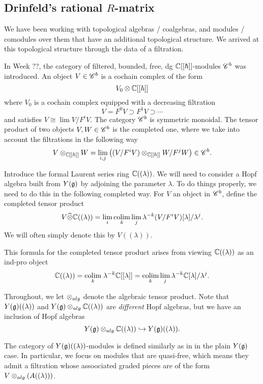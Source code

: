 \documentclass[11pt]{amsart}
\begin{document}
\subsection{Drinfeld's rational $R$-matrix}
We have been working with topological algebras / coalgebras, and modules / comodules over them that have an additional topological structure. 
We arrived at this topological structure through the data of a filtration.

In Week ??, the category of filtered, bounded, free, dg $\mathbb C[[\hbar]]$-modules $\mathscr C^b$ was introduced. 
An object $V \in \mathscr C^b$ is a cochain complex of the form
\[
V_0 \otimes \mathbb C[[\hbar]] 
\]
where $V_0$ is a cochain complex equipped with a decreasing filtration $$V = F^0 V \supset F^1 V \supset \cdots$$ and satisfies $V \cong \lim V / F^i V.$
The category $\mathscr C^b$ is symmetric monoidal.
The tensor product of two objects $V, W \in \mathscr C^b$ is the completed one, where we take into account the filtrations in the following way
\[
V \otimes_{\mathbb C[[\hbar]]} W = \lim_{i,j} \left((V / F^i V) \otimes_{\mathbb C[[\hbar]]} W / F^j W\right)  \in \mathscr C^b .
\]

Introduce the formal Laurent series ring $\mathbb C((\lambda))$. 
We will need to consider a Hopf algebra built from $Y(\mathfrak g)$ by adjoining the parameter $\lambda$. 
To do things properly, we need to do this in the following completed way.
For $V$ an object in $\mathscr C^b$, define the completed tensor product
\[
V \widehat{\otimes} \mathbb C((\lambda)) = \lim_i \underset{k}{\rm colim} \lim_j \lambda^{-k} (V / F^i V) [\lambda] / \lambda^j .
\]
We will often simply denote this by $V((\lambda))$. 

\begin{rmk}
This formula for the completed tensor product arises from viewing $\mathbb C((\lambda))$ as an ind-pro object
\[
\mathbb C((\lambda)) = \underset{k}{\rm colim} \; \lambda^{-k} \mathbb C[[\lambda]] = \underset{k}{\rm colim} \lim_{j} \lambda^{-k} \mathbb C[\lambda] / \lambda^j .
\]
\end{rmk}

\begin{rmk}
Throughout, we let $\otimes_{alg}$ denote the algebraic tensor product. 
Note that $Y(\mathfrak g)((\lambda))$ and $Y(\mathfrak g)\otimes_{alg} \mathbb C((\lambda))$ are {\em different} Hopf algebras, but we have an inclusion of Hopf algebras
\[
Y(\mathfrak g)\otimes_{alg} \mathbb C((\lambda)) \hookrightarrow Y(\mathfrak g)((\lambda)).
\] 
\end{rmk}

The category of $Y(\mathfrak g)((\lambda))$-modules is defined similarly as in in the plain $Y(\mathfrak g)$ case. 
In particular, we focus on modules that are quasi-free, which means they admit a filtration whose assoociated graded pieces are of the form $V \otimes_{alg} (A((\lambda)))$. 
\end{document}
